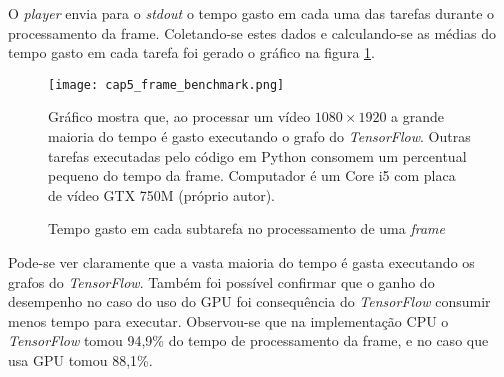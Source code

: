O \emph{player} envia para o \emph{stdout} o tempo gasto em cada uma das
tarefas durante o processamento da frame. Coletando-se estes dados e
calculando-se as médias do tempo gasto em cada tarefa foi gerado o
gráfico na figura \ref{fig:cap5_frame_benchmark}.

\begin{figure}[!htb]
	\centering
	\texttt{[image: cap5\_frame\_benchmark.png]}
	\caption{Tempo gasto em cada subtarefa no processamento de uma
		\emph{frame}}
	\label{fig:cap5_frame_benchmark}
	Gráfico mostra que, ao processar um vídeo $1080 \times 1920$ a grande
	maioria do tempo é gasto executando o grafo do \emph{TensorFlow}. Outras
	tarefas executadas pelo código em Python consomem um percentual
	pequeno do tempo da frame. Computador é um Core i5 com
	placa de vídeo GTX 750M (próprio autor).
\end{figure}

Pode-se ver claramente que a vasta maioria do tempo é gasta executando os
grafos do \emph{TensorFlow}. Também foi possível confirmar que o ganho do
desempenho no caso do uso do GPU foi consequência do \emph{TensorFlow}
consumir menos tempo para executar. Observou-se que na implementação CPU
o \emph{TensorFlow} tomou 94,9\% do tempo de processamento da frame, e no
caso que usa GPU tomou 88,1\%.
